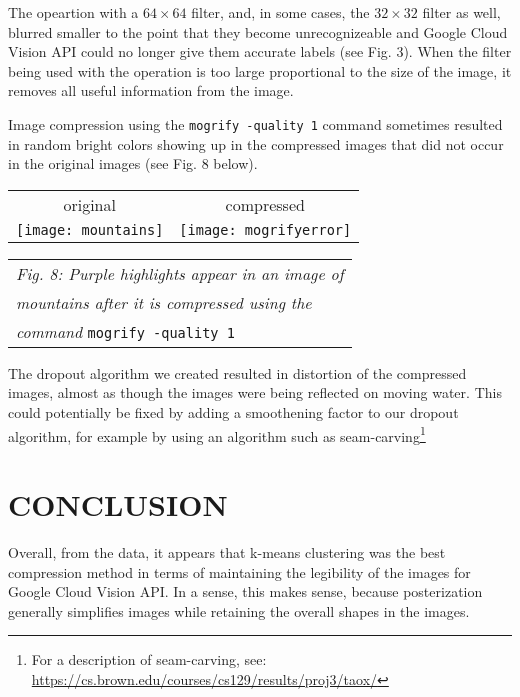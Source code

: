 \documentclass[letterpaper, 12 pt, conference]{ieeeconf}  %
\begin{document}
The  opeartion with a $64 \times 64$ filter,
and, in some cases, the $32 \times 32$ filter as well,
blurred smaller to the point that they become unrecognizeable and
Google Cloud Vision API could no longer give them accurate labels (see
Fig. 3). When the filter being used with the 
operation is too large proportional to the size of the image, it
removes all useful information from the image.

Image compression using the {\tt mogrify -quality 1} command
sometimes resulted in random bright colors showing up in the compressed
images that did not occur in the original images (see Fig. 8 below).

\vspace*{3mm}
\begin{tabular}{c c}
	original & compressed \\
	\texttt{[image: mountains]} &
		\texttt{[image: mogrifyerror]} \\
\end{tabular}
\begin{tabular}{l}
	\hspace*{4mm} {\it Fig. 8: Purple highlights appear in an image of } \\
	\hspace*{4mm} {\it mountains after it is compressed using the } \\
	\hspace*{4mm} {\it command} {\tt mogrify -quality 1} \\
\end{tabular}
\vspace*{3mm}

The dropout algorithm we created resulted in distortion of
the compressed images, almost as though the images
were being reflected on moving water.
This could potentially be fixed by adding a smoothening
factor to our dropout algorithm, for example by
using an algorithm such as seam-carving\footnote{For a description
of seam-carving, see: \url{https://cs.brown.edu/courses/cs129/results/proj3/taox/}}

\section{CONCLUSION}

Overall, from the data, it appears that k-means clustering was
the best compression method in terms of maintaining the legibility
of the images for Google Cloud Vision API. In a sense, this makes
sense, because posterization generally simplifies images while
retaining the overall shapes in the images.
\end{document}
